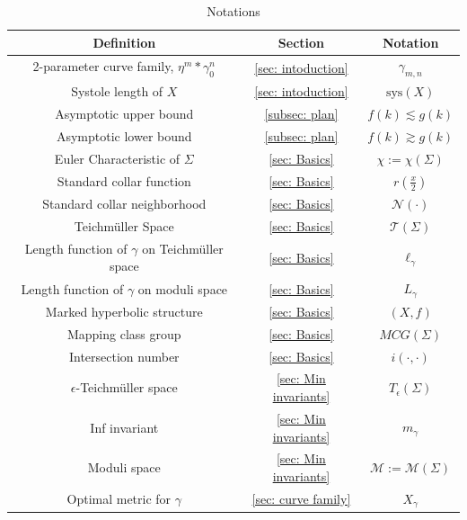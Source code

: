 \documentclass[12pt]{amsart}
\numberwithin{equation}{section}
\theoremstyle{plain}
\begin{document}
 
  
 
\begin{center} \begin{table}
	\begin{tabular}{|c|c|c|}
		\hline \hline 
		{\bf Definition} & {\bf Section} &{\bf Notation} \\
		\hline
		\hline 
		\hline
        2-parameter curve family, 
        $\eta^{m}\ast \gamma_{0}^{n}$& \ref{sec: intoduction} &$\gamma_{m,n}$\\
		\hline
        Systole length  of $X$ & \ref{sec: intoduction}& $\text{sys}(X)$\\
		\hline
		Asymptotic upper bound& \ref{subsec: plan} &$f(k) \lesssim g(k)$ \\
		\hline
		Asymptotic lower  bound& \ref{subsec: plan} &$f(k) \gtrsim g(k)$ \\
        \hline
		Euler Characteristic of $\Sigma$ & \ref{sec: Basics} &$\chi := \chi(\Sigma)$ \\
        \hline
        
		Standard  collar function& \ref{sec: Basics} &$r(\frac{x}{2})$ \\
		\hline
		Standard collar neighborhood& \ref{sec: Basics}  & $\mathcal{N}(\cdot)$ \\
		\hline
		Teichm\"uller Space&\ref{sec: Basics}  & $\mathcal{T}(\Sigma)$  \\
		\hline 
		
		Length function of $\gamma$ on Teichm\"{u}ller space & \ref{sec: Basics}  & $\ell_{\gamma}$  \\
		\hline
		Length function of $\gamma$ on moduli space & \ref{sec: Basics}  & $L_{\gamma}$  \\
		\hline
		Marked hyperbolic structure & \ref{sec: Basics} &$(X,f)$   \\
		\hline
		Mapping class group&\ref{sec: Basics}& $MCG(\Sigma)$\\
		\hline
		Intersection number& \ref{sec: Basics} & $i(\cdot ,\cdot)$\\
		\hline
        $\epsilon$-Teichm\"uller space& \ref{sec: Min  invariants} & $T_{\epsilon}(\Sigma)$  \\
	        \hline
		Inf  invariant& \ref{sec: Min  invariants} & $m_{\gamma}$ \\
		\hline
		Moduli space& \ref{sec: Min  invariants}& $\mathcal{M}:=\mathcal{M}(\Sigma)$  \\
		\hline
		Optimal metric for $\gamma$& \ref{sec: curve family} & $X_{\gamma}$ \\
        \hline
        \hline
	\end{tabular} \caption{Notations} \label{table:1}
\end{table}\end{center}
\end{document}
